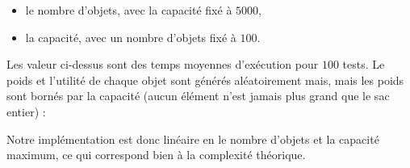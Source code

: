 \begin{itemize}
\item le nombre d'objets, avec la capacité fixé à $5000$,
\item la capacité, avec un nombre d'objets fixé à $100$.
\end{itemize}

Les valeur ci-dessus sont des temps moyennes d'exécution pour $100$ tests. Le poids et l'utilité de chaque objet sont générés aléatoirement mais, mais les poids sont bornés par la capacité (aucun élément n'est jamais plus grand que le sac entier) :

\begin{figure}[ht]
\begin{minipage}[b]{0.5\linewidth}
\centering
{}
\end{minipage}
\hspace{0.5cm}
\begin{minipage}[b]{0.5\linewidth}
\centering
{}
\end{minipage}
\end{figure}

Notre implémentation est donc linéaire en le nombre d'objets et la capacité maximum, ce qui correspond bien à la complexité théorique.
